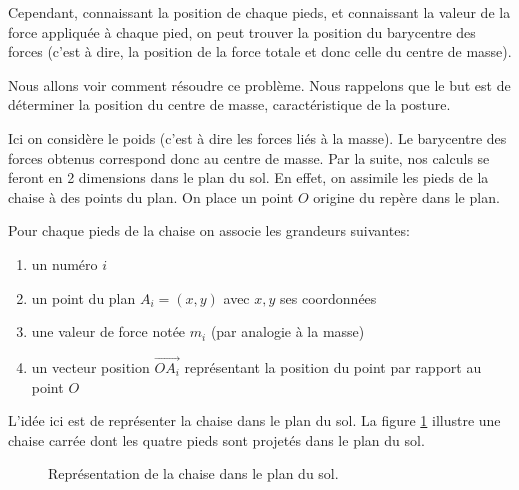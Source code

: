 \documentclass{polytech/polytech}
\begin{document}
Cependant, connaissant la position de chaque pieds, et connaissant la valeur de la force appliquée à chaque pied, on peut trouver la position du barycentre des forces (c'est à dire, la position de la force totale et donc celle du centre de masse). 

Nous allons voir comment résoudre ce problème.
 Nous rappelons que le but est de déterminer la position du centre de masse, caractéristique de la posture.

Ici on considère le poids (c'est à dire les forces liés à la masse). Le barycentre des forces obtenus correspond donc au centre de masse. 
Par la suite, nos calculs se feront en 2 dimensions dans le plan du sol. En effet, on assimile les pieds de la chaise à des points du plan. On place un point $O$ origine du repère dans le plan. 

Pour chaque pieds de la chaise on associe les grandeurs suivantes:

\begin{enumerate}
\item un numéro $i$
\item un point du plan $A_i=(x,y)$ avec $x,y$ ses coordonnées
\item une valeur de force notée $m_i$ (par analogie à la masse)
\item un vecteur position $\vec{OA_i}$ représentant la position du point par rapport au point $O$
\end{enumerate}

L'idée ici est de représenter la chaise dans le plan du sol. La figure \ref{fig:schem_plan_sol_math} illustre une chaise carrée dont les quatre pieds sont projetés dans le plan du sol.


\begin{figure}[htbp]
\begin{center}
\end{center}
\caption{Représentation de la chaise dans le plan du sol.}
\label{fig:schem_plan_sol_math}
\end{figure}
\end{document}
